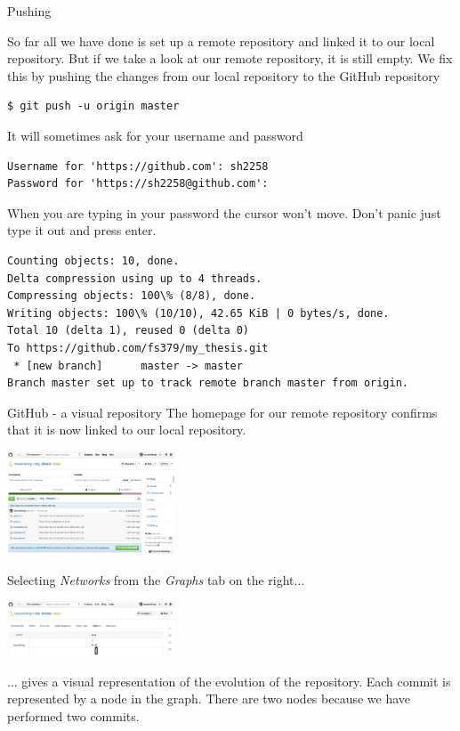 \documentclass[10pt]{beamer}
\begin{document}
\begin{frame}[fragile]{Pushing}

So far all we have done is set up a remote repository and linked it to our local repository. But if we take a look at our remote repository, it is still empty. We fix this by pushing the changes from our local repository to the GitHub repository
\begin{lstlisting}
$ git push -u origin master
\end{lstlisting}
It will sometimes ask for your username and password
\begin{lstlisting}[frame=single]
Username for 'https://github.com': sh2258
Password for 'https://sh2258@github.com':
\end{lstlisting}
When you are typing in your password the cursor won't move. Don't panic just type it out and press enter.
\begin{lstlisting}[frame=single]
Counting objects: 10, done.
Delta compression using up to 4 threads.
Compressing objects: 100\% (8/8), done.
Writing objects: 100\% (10/10), 42.65 KiB | 0 bytes/s, done.
Total 10 (delta 1), reused 0 (delta 0)
To https://github.com/fs379/my_thesis.git
 * [new branch]      master -> master
Branch master set up to track remote branch master from origin.
\end{lstlisting}

\end{frame}





\begin{frame}[fragile]{GitHub - a visual repository}
The homepage for our remote repository confirms that it is now linked to our local repository.
\begin{center}
\includegraphics[width=5cm]{./auxfiles/Ghub3.jpg}
\end{center}
Selecting \emph{Networks} from the \emph{Graphs} tab on the right...

\begin{center}
\includegraphics[width=5cm]{./auxfiles/Network.jpg}
\end{center}
... gives a visual representation of the evolution of the repository. Each commit is represented by a node in the graph. There are two nodes because we have performed two commits.




\end{frame}
\end{document}
